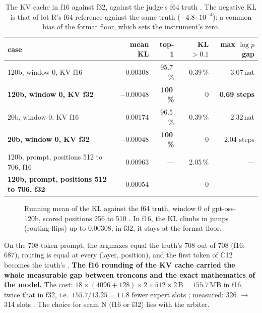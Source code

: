 \begin{table}[!htbp]
\centering\small
\caption[The KV cache in f16 against f32]{The KV cache in f16 against f32, against the judge's f64 truth \mes. The negative KL is that of lot R's f64 reference against the same truth ($-4.8\cdot10^{-4}$): a common bias of the format floor, which sets the instrument's zero.}
\label{tab:t2n-kv}
\begin{tabular}{@{}lrrrr@{}}
\toprule
case & mean KL & top-1 & KL $> 0.1$ & max $\log p$ gap \\
\midrule
120b, window 0, KV f16 & 0.00308 & 95.7\,\% & 0.39\,\% & 3.07\,nat \\
\textbf{120b, window 0, KV f32} & $\mathbf{-0.00048}$ & \textbf{100\,\%} & 0 & \textbf{0.69 steps} \\
20b, window 0, KV f16 & 0.00174 & 96.5\,\% & 0.39\,\% & 2.32\,nat \\
\textbf{20b, window 0, KV f32} & $\mathbf{-0.00048}$ & \textbf{100\,\%} & 0 & 2.04 steps \\
120b, prompt, positions 512 to 706, f16 & 0.00963 & — & 2.05\,\% & — \\
\textbf{120b, prompt, positions 512 to 706, f32} & $\mathbf{-0.00054}$ & — & 0 & — \\
\bottomrule
\end{tabular}
\end{table}

\begin{figure}[!htbp]
\centering
\GrapheNoyKV
\caption[The KV cache: f16 against f32, 120b]{Running mean of the KL against the f64 truth, window 0 of gpt-oss-120b, scored positions 256 to 510 \mes. In f16, the KL climbs in jumps (routing flips) up to 0.00308; in f32, it stays at the format floor.}
\label{fig:t2n-kv}
\end{figure}

On the 708-token prompt, the argmaxes equal the truth's 708 out of 708 (f16: 687), routing is equal at every (layer, position), and the first token of C12 becomes the truth's \mes. \textbf{The f16 rounding of the KV cache carried the whole measurable gap between troncons and the exact mathematics of the model.} The cost: $18 \times (\num{4096} + 128) \times 2 \times 512 \times 2\,\text{B} = 155.7$\,MB in f16, twice that in f32, i.e.\ $155.7 / 13.25 = 11.8$ fewer expert slots \calc; measured: 326 $\to$ 314 slots \mes. The choice for seam N (f16 or f32) lies with the arbiter.

